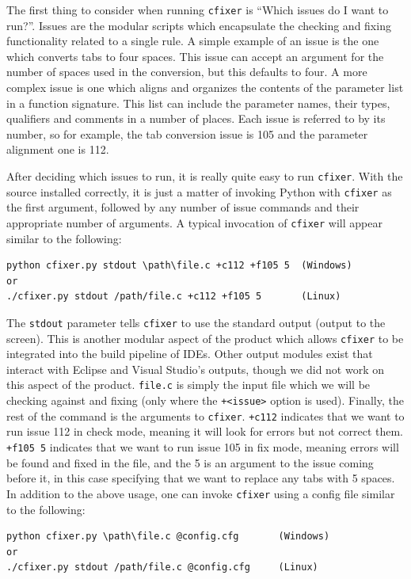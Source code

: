 \documentclass[11pt]{scrreprt}
\begin{document}
The first thing to consider when running \texttt{cfixer} is “Which issues do I want to run?”.
Issues are the modular scripts which encapsulate the checking and fixing functionality related to a single rule.
A simple example of an issue is the one which converts tabs to four spaces.
This issue can accept an argument for the number of spaces used in the conversion, but this defaults to four.
A more complex issue is one which aligns and organizes the contents of the parameter list in a function signature.
This list can include the parameter names, their types, qualifiers and comments in a number of places.
Each issue is referred to by its number, so for example, the tab conversion issue is 105 and the parameter alignment one is 112.

After deciding which issues to run, it is really quite easy to run \texttt{cfixer}. With the source installed correctly, it is just a matter of invoking Python with \texttt{cfixer} as the first argument, followed by any number of issue commands and their appropriate number of arguments. 
A typical invocation of \texttt{cfixer} will appear similar to the following:\\
\lstset{language=Python}
\begin{minipage}{\linewidth}
\begin{lstlisting}[frame=single,basicstyle=\small]
python cfixer.py stdout \path\file.c +c112 +f105 5	(Windows)
or
./cfixer.py stdout /path/file.c +c112 +f105 5		(Linux)
\end{lstlisting}
\end{minipage}

The \texttt{stdout} parameter tells \texttt{cfixer} to use the standard output (output to the screen).
This is another modular aspect of the product which allows \texttt{cfixer} to be integrated into the build pipeline of IDEs.
Other output modules exist that interact with Eclipse and Visual Studio’s outputs, though we did not work on this aspect of the product.
\texttt{file.c} is simply the input file which we will be checking against and fixing (only where the \texttt{+<issue>} option is used). 
Finally, the rest of the command is the arguments to \texttt{cfixer}.
\texttt{+c112} indicates that we want to run issue 112 in check mode, meaning it will look for errors but not correct them.
\texttt{+f105 5} indicates that we want to run issue 105 in fix mode, meaning errors will be found and fixed in the file, and the 5 is an argument to the issue coming before it, in this case specifying that we want to replace any tabs with 5 spaces.
In addition to the above usage, one can invoke \texttt{cfixer} using a config file similar to the following:\\
\lstset{language=Python}
\begin{minipage}{\linewidth}
\begin{lstlisting}[frame=single,basicstyle=\small]
python cfixer.py \path\file.c @config.cfg		(Windows)
or
./cfixer.py stdout /path/file.c @config.cfg		(Linux)
\end{lstlisting}
\end{minipage}
\end{document}
